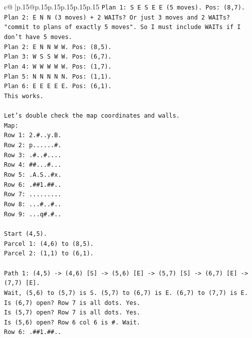 \documentclass{article}
\begin{document}
{\begin{supertabular}{c@{$\;$}|p{.15\linewidth}@{}p{.15\linewidth}p{.15\linewidth}p{.15\linewidth}p{.15\linewidth}p{.15\linewidth}}
{{{\texttt{Plan 1: S E S E E (5 moves). Pos: (8,7).} \\
\texttt{Plan 2: E N N (3 moves) + 2 WAITs? Or just 3 moves and 2 WAITs?} \\
\texttt{"commit to plans of exactly 5 moves". So I must include WAITs if I don't have 5 moves.} \\
\texttt{Plan 2: E N N W W. Pos: (8,5).} \\
\texttt{Plan 3: W S S W W. Pos: (6,7).} \\
\texttt{Plan 4: W W W W W. Pos: (1,7).} \\
\texttt{Plan 5: N N N N N. Pos: (1,1).} \\
\texttt{Plan 6: E E E E E. Pos: (6,1).} \\
\texttt{This works.} \\
\\ 
\texttt{Let's double check the map coordinates and walls.} \\
\texttt{Map:} \\
\texttt{Row 1: 2.\#..y.B.} \\
\texttt{Row 2: p......\#.} \\
\texttt{Row 3: .\#..\#....} \\
\texttt{Row 4: \#\#...\#...} \\
\texttt{Row 5: .A.S..\#x.} \\
\texttt{Row 6: .\#\#1.\#\#..} \\
\texttt{Row 7: .........} \\
\texttt{Row 8: ...\#..\#..} \\
\texttt{Row 9: ...q\#.\#..} \\
\\ 
\texttt{Start (4,5).} \\
\texttt{Parcel 1: (4,6) to (8,5).} \\
\texttt{Parcel 2: (1,1) to (6,1).} \\
\\ 
\texttt{Path 1: (4,5) {-}> (4,6) {[}S{]} {-}> (5,6) {[}E{]} {-}> (5,7) {[}S{]} {-}> (6,7) {[}E{]} {-}> (7,7) {[}E{]}.} \\
\texttt{Wait, (5,6) to (5,7) is S. (5,7) to (6,7) is E. (6,7) to (7,7) is E.} \\
\texttt{Is (6,7) open? Row 7 is all dots. Yes.} \\
\texttt{Is (5,7) open? Row 7 is all dots. Yes.} \\
\texttt{Is (5,6) open? Row 6 col 6 is \#. Wait.} \\
\texttt{Row 6: .\#\#1.\#\#..} \\
}}}
\end{supertabular}}
\end{document}
